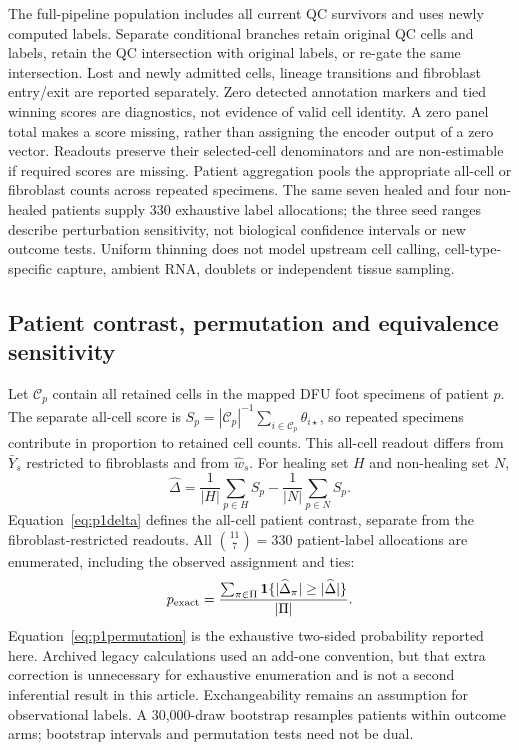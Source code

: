 \documentclass[10pt,a4paper]{article}
\begin{document}
The full-pipeline population includes all current QC survivors and uses newly computed labels. Separate conditional branches retain original QC cells and labels, retain the QC intersection with original labels, or re-gate the same intersection. Lost and newly admitted cells, lineage transitions and fibroblast entry/exit are reported separately. Zero detected annotation markers and tied winning scores are diagnostics, not evidence of valid cell identity. A zero panel total makes a score missing, rather than assigning the encoder output of a zero vector. Readouts preserve their selected-cell denominators and are non-estimable if required scores are missing. Patient aggregation pools the appropriate all-cell or fibroblast counts across repeated specimens. The same seven healed and four non-healed patients supply 330 exhaustive label allocations; the three seed ranges describe perturbation sensitivity, not biological confidence intervals or new outcome tests. Uniform thinning does not model upstream cell calling, cell-type-specific capture, ambient RNA, doublets or independent tissue sampling.

\subsection{Patient contrast, permutation and equivalence sensitivity}
Let $\mathcal C_p$ contain all retained cells in the mapped DFU foot specimens of patient $p$. The separate all-cell score is $S_p=|\mathcal C_p|^{-1}\sum_{i\in\mathcal C_p}\theta_{i\star}$, so repeated specimens contribute in proportion to retained cell counts. This all-cell readout differs from $\bar Y_s$ restricted to fibroblasts and from $\widehat w_s$. For healing set $H$ and non-healing set $N$,
\begin{equation}
\widehat\Delta=\frac1{|H|}\sum_{p\in H}S_p-\frac1{|N|}\sum_{p\in N}S_p.\label{eq:p1delta}
\end{equation}
Equation~\eqref{eq:p1delta} defines the all-cell patient contrast, separate from the fibroblast-restricted readouts. All $\binom{11}{7}=330$ patient-label allocations are enumerated, including the observed assignment and ties:
\begin{equation}
p_{\rm exact}=\frac{\sum_{\pi\in\Pi}\mathbf{1}\{|\widehat\Delta_\pi|\geq|\widehat\Delta|\}}{|\Pi|}.\label{eq:p1permutation}
\end{equation}
Equation~\eqref{eq:p1permutation} is the exhaustive two-sided probability reported here. Archived legacy calculations used an add-one convention, but that extra correction is unnecessary for exhaustive enumeration and is not a second inferential result in this article. Exchangeability remains an assumption for observational labels. A 30,000-draw bootstrap resamples patients within outcome arms; bootstrap intervals and permutation tests need not be dual.
\end{document}
